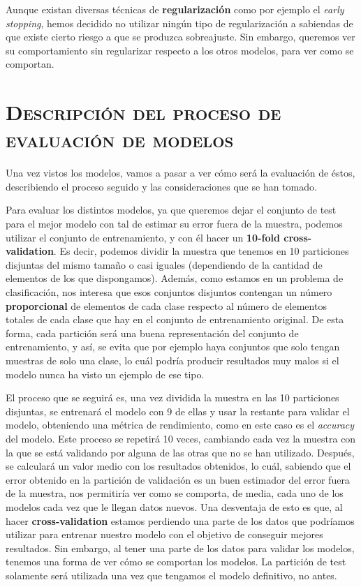 \documentclass[11pt,a4paper]{article}
\begin{document}
Aunque existan diversas técnicas de \textbf{regularización} como por ejemplo el \textit{early stopping}, hemos decidido no utilizar ningún tipo de
regularización a sabiendas de que existe cierto riesgo a que se produzca sobreajuste. Sin embargo, queremos ver su comportamiento sin
regularizar respecto a los otros modelos, para ver como se comportan.

\section{\textsc{Descripción del proceso de evaluación de modelos}}

Una vez vistos los modelos, vamos a pasar a ver cómo será la evaluación de éstos, describiendo el proceso seguido y las consideraciones que
se han tomado.

Para evaluar los distintos modelos, ya que queremos dejar el conjunto de test para el mejor modelo con tal de estimar su error fuera de la
muestra, podemos utilizar el conjunto de entrenamiento, y con él hacer un \textbf{10-fold cross-validation}. Es decir, podemos dividir
la muestra que tenemos en 10 particiones disjuntas del mismo tamaño o casi iguales (dependiendo de la cantidad de elementos de los que
dispongamos). Además, como estamos en un problema de clasificación, nos interesa que esos conjuntos disjuntos contengan un número \textbf{proporcional}
de elementos de cada clase respecto al número de elementos totales de cada clase que hay en el conjunto de entrenamiento original. De esta
forma, cada partición será una buena representación del conjunto de entrenamiento, y así, se evita que por ejemplo haya conjuntos que solo
tengan muestras de solo una clase, lo cuál podría producir resultados muy malos si el modelo nunca ha visto un ejemplo de ese tipo.

El proceso que se seguirá es, una vez dividida la muestra en las 10 particiones disjuntas, se entrenará el modelo con 9 de ellas y
usar la restante para validar el modelo, obteniendo una métrica de rendimiento, como en este caso es el \textit{accuracy} del modelo.
Este proceso se repetirá 10 veces, cambiando cada vez la muestra con la que se está validando por alguna de las otras que no se han utilizado.
Después, se calculará un valor medio con los resultados obtenidos, lo cuál, sabiendo que el error obtenido en la partición de validación
es un buen estimador del error fuera de la muestra, nos permitiría ver como se comporta, de media, cada uno de los modelos cada vez que le
llegan datos nuevos. Una desventaja de esto es que, al hacer \textbf{cross-validation} estamos perdiendo una parte de los datos que podríamos
utilizar para entrenar nuestro modelo con el objetivo de conseguir mejores resultados. Sin embargo, al tener una parte de los datos para
validar los modelos, tenemos una forma de ver cómo se comportan los modelos. La partición de test solamente será utilizada una vez que tengamos
el modelo definitivo, no antes.
\end{document}
